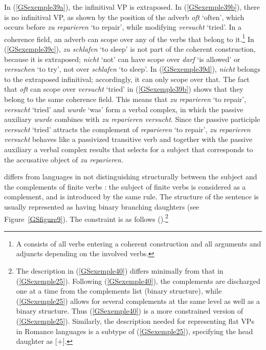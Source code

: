 \noindent
In (\ref{GSexemple39a}), the infinitival VP is extraposed. In (\ref{GSexemple39b}), there is no
infinitival VP, as shown by the position of the adverb \emph{oft} `often', which occurs before
\emph{zu reparieren} `to repair', while modifying \emph{versucht} `tried'. In a coherence field, an
adverb can scope over any of the verbs that belong to it.\footnote{%
A  consists of all verbs entering a coherent construction and all arguments and
adjuncts depending on the involved verbs.
} In (\ref{GSexemple39c}), \emph{zu schlafen} `to sleep' is not part of the coherent construction,
because it is extraposed; \emph{nicht} `not' can have scope over \emph{darf} `is allowed' or
\emph{versuchen} `to try', not over \emph{schlafen} `to sleep'. In (\ref{GSexemple39d}),
\emph{nicht} belongs to the extraposed infinitival; accordingly, it can only scope over that. The
fact that \emph{oft} can scope over \emph{versucht} `tried' in (\ref{GSexemple39b}) shows that they belong
to the same coherence field. This means that \emph{zu reparieren} `to repair',
  \emph{versucht} `tried' and \emph{wurde} `was' form a verbal complex, in which the passive auxiliary \emph{wurde} combines with
\emph{zu reparieren versucht}. Since the passive participle \emph{versucht} `tried' attracts the
complement of \emph{reparieren} `to repair', \emph{zu reparieren versucht} behaves like a passivized transitive verb and together with the
passive auxiliary a verbal complex results that selects for a subject that corresponds to the
accusative object of \emph{zu reparieren}.

 differs from  languages in not distinguishing structurally between the
subject and the complements of finite verbs \citep{Pollard90a-Eng}: the subject of finite
  verbs is considered as a complement, and is introduced by the same rule. The structure of the sentence is usually represented as having binary branching daughters (see Figure~\ref{GSfigure9}). The constraint is as follows (\citealt[21]{muller2018clause}).\footnote{The description in (\ref{GSexemple40}) differs minimally from that in (\ref{GSexemple25}). Following (\ref{GSexemple40}), the complements are discharged one at a time from the complements list (binary structure), while (\ref{GSexemple25}) allows for several complements at the same level as well as a binary	structure. Thus (\ref{GSexemple40}) is a more constrained version of (\ref{GSexemple25}). Similarly, the description needed for representing flat VPs in Romance languages is a subtype of (\ref{GSexemple25}), specifying the head daughter as \mbox{[\light{}$+$]}.}

